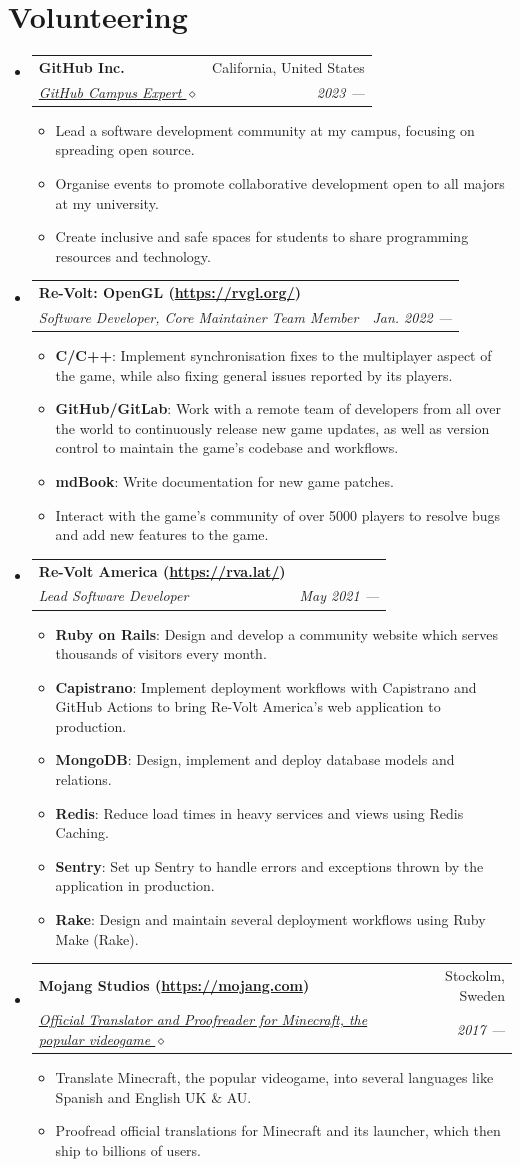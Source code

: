 \documentclass[letterpaper,11pt]{article}
\makeatletter
\newcommand{\resumeItem}[2]{
  \item\small{
    \textbf{#1}{: #2 \vspace{-2pt}}
  }
}
\newcommand{\resumeSubheading}[4]{
  \vspace{-1pt}\item
    \begin{tabular*}{0.97\textwidth}[t]{l@{\extracolsep{\fill}}r}
      \textbf{#1} & #2 \\
      \textit{\small#3} & \textit{\small #4} \\
    \end{tabular*}\vspace{-5pt}
}
\newcommand{\resumeSubHeadingListStart}{\begin{itemize}[leftmargin=*]}
\newcommand{\resumeSubHeadingListEnd}{\end{itemize}}
\newcommand{\resumeItemListStart}{\begin{itemize}}
\newcommand{\resumeItemListEnd}{\end{itemize}\vspace{-5pt}}
\makeatother
\begin{document}
\section{Volunteering}
  \resumeSubHeadingListStart
     \resumeSubheading
    {GitHub Inc.}{California, United States}
    {\href{https://githubcampus.expert/BGMP}{GitHub Campus Expert $\diamond$}}{2023 ---}
	    \resumeItemListStart
			\item{Lead a software development community at my campus, focusing on spreading open source.}
			\item{Organise events to promote collaborative development open to all majors at my university.}
			\item{Create inclusive and safe spaces for students to share programming resources and technology.}
	    \resumeItemListEnd
	 \resumeSubheading
	    {Re-Volt: OpenGL (\textnormal{\url{https://rvgl.org/}})}{}
	    {Software Developer, Core Maintainer Team Member}{Jan. 2022 ---}
	    \resumeItemListStart
	    \resumeItem{C/C++}{Implement synchronisation fixes to the multiplayer aspect of the game, while also fixing general issues reported by its players.}
	    \resumeItem{GitHub/GitLab}{Work with a remote team of developers from all over the world to continuously release new game updates, as well as version control to maintain the game's codebase and workflows.}
	    \resumeItem{mdBook}{Write documentation for new game patches.}
	    \item{Interact with the game's community of over 5000 players to resolve bugs and add new features to the game.}
	    \resumeItemListEnd
	\resumeSubheading
	{Re-Volt America (\textnormal{\url{https://rva.lat/}})}{}
	{Lead Software Developer}{May 2021 ---}
	\resumeItemListStart
		\resumeItem{Ruby on Rails}{Design and develop a community website which serves thousands of visitors every month.}
		\resumeItem{Capistrano}{Implement deployment workflows with Capistrano and GitHub Actions to bring Re-Volt America's web application to production.}
		\resumeItem{MongoDB}{Design, implement and deploy database models and relations.}
		\resumeItem{Redis}{Reduce load times in heavy services and views using Redis Caching.}
		\resumeItem{Sentry}{Set up Sentry to handle errors and exceptions thrown by the application in production.}
		\resumeItem{Rake}{Design and maintain several deployment workflows using Ruby Make (Rake).}
	\resumeItemListEnd
  \resumeSubheading
	{Mojang Studios (\textnormal{\url{https://mojang.com}})}{Stockolm, Sweden}
	{\href{https://crowdin.com/profile/bgm}{Official Translator and Proofreader for Minecraft, the popular videogame $\diamond$}}{2017 ---}
    \resumeItemListStart
		\item{Translate Minecraft, the popular videogame, into several languages like Spanish and English UK \& AU.}
		\item{Proofread official translations for Minecraft and its launcher, which then ship to billions of users.}
	\resumeItemListEnd
  \resumeSubHeadingListEnd
    
\end{document}
